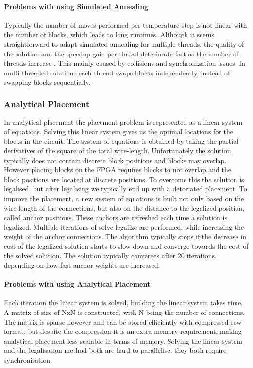 \documentclass[a4paper,oneside,12pt]{article}
\begin{document}
\paragraph{Problems with using Simulated Annealing}
Typically the number of moves performed per temperature step is not linear with the number of blocks, which leads to long runtimes.
Although it seems straightforward to adapt simulated annealing for multiple threads, the quality of the solution and the speedup gain per thread deteriorate fast as the number of threads increase \cite{ludwin2011}. This mainly caused by collisions and synchronization issues. In multi-threaded solutions each thread swaps blocks independently, instead of swapping blocks sequentially.

\subsubsection{Analytical Placement}
In analytical placement the placement problem is represented as a linear system of equations. Solving this linear system gives us the optimal locations for the blocks in the circuit. The system of equations is obtained by taking the partial derivatives of the square of the total wire-length. 
Unfortunately the solution typically does not contain discrete block positions and blocks may overlap. However placing blocks on the FPGA requires blocks to not overlap and the block positions are located at discrete positions. 
To overcome this the solution is legalised, but after legalising we typically end up with a detoriated placement. To improve the placement, a new system of equations is built not only based on the wire length of the connections, but also on the distance to the legalized position, called anchor positions. These anchors are refreshed each time a solution is legalized.
Multiple iterations of solve-legalize are performed, while increasing the weight of the anchor connections. The algorithm typically stops if the decrease in cost of the legalized solution starts to slow down and converge towards the cost of the solved solution.  The solution typically converges after 20 iterations, depending on how fast anchor weights are increased. 

\paragraph{Problems with using Analytical Placement}
Each iteration the linear system is solved, building the linear system takes time. A matrix of size of NxN is constructed, with N being the number of connections. The matrix is sparse however and can be stored efficiently with compressed row format, but despite the compression it is an extra memory requirement, making analytical placement less scalable in terms of memory.
Solving the linear system and the legalisation method both are hard to parallelise, they both require synchronisation.
\end{document}
